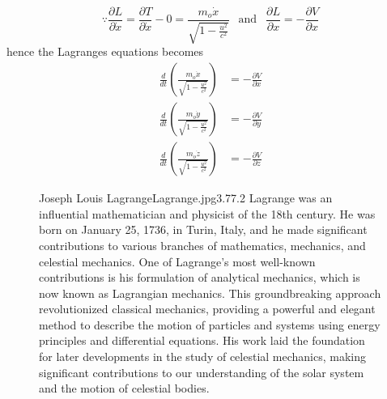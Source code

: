\documentclass{article}
\begin{document}
\[
\because \frac{\partial L}{\partial \dot{x}} = \frac{\partial T}{\partial \dot{x}} - 0 = \frac{m_o \dot{x}}{\sqrt{1 - \frac{u^2}{c^2}}}
\ \ \text{ and } \ \ \frac{\partial L}{\partial x} = -\frac{\partial V}{\partial x}
\]
hence the  Lagranges equations becomes
\begin{align*}
    \frac{d}{dt} \left(\frac{m_o \dot{x}}{\sqrt{1 - \frac{u^2}{c^2}}}\right) &= -\frac{\partial V}{\partial x}\\
    \frac{d}{dt} \left(\frac{m_o \dot{y}}{\sqrt{1 - \frac{u^2}{c^2}}}\right) &= -\frac{\partial V}{\partial y}\\
    \frac{d}{dt} \left(\frac{m_o \dot{z}}{\sqrt{1 - \frac{u^2}{c^2}}}\right) &= -\frac{\partial V}{\partial z}
\end{align*}
\begin{figure}[b]
\begin{enrichment}{Joseph Louis Lagrange}{Lagrange.jpg}{3}{.77}{.2}
    Lagrange was an influential mathematician and physicist of the 18th century. He was born on January 25, 1736, in Turin, Italy, and he made significant contributions to various branches of mathematics, mechanics, and celestial mechanics.
    One of Lagrange's most well-known contributions is his formulation of analytical mechanics, which is now known as Lagrangian mechanics. This groundbreaking approach revolutionized classical mechanics, providing a powerful and elegant method to describe the motion of particles and systems using energy principles and differential equations. His work laid the foundation for later developments in the study of celestial mechanics, making significant contributions to our understanding of the solar system and the motion of celestial bodies.
\end{enrichment}
\end{figure}
\end{document}
